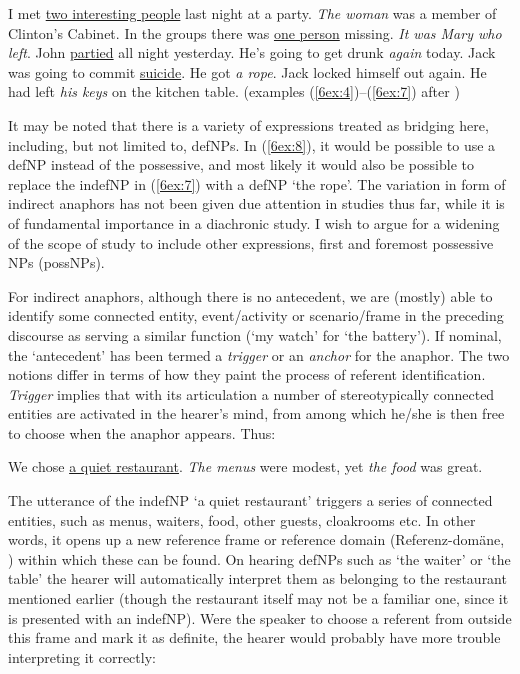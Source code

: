 \documentclass[output=paper]{langsci/langscibook}
\begin{document}
\begin{exe}
\ex\label{6ex:4}
I met {\ul{two interesting people}} last night at a party. {\emph{The woman}} was a member of Clinton's Cabinet. 
\ex\label{6ex:5}
In the groups there was {\ul{one person}} missing. {\emph{It was Mary who left}}. 
\ex\label{6ex:6}
John {\ul{partied}} all night yesterday. He's going to get drunk {\emph{again}} today.
\ex\label{6ex:7}
Jack was going to commit {\ul{suicide}}. He got {\emph{a rope}}. 
\ex\label{6ex:8}
Jack locked himself out again. He had left {\emph{his keys}} on the kitchen table. 
\exi{}
\hspace*{-0.8cm}(examples (\ref{6ex:4})--(\ref{6ex:7}) after \citealt[][83]{asher:lascarides:98})
\end{exe}

{
It may be noted that there is a variety of expressions treated as bridging here, including, but not limited to, defNPs. In (\ref{6ex:8}), it would be possible to use a defNP instead of the possessive, and most likely it would also be possible to replace the indefNP in (\ref{6ex:7}) with a defNP `the rope'. The variation in form of indirect anaphors has not been given due attention in studies thus far, while it is of fundamental importance in a diachronic study. I wish to argue for a widening of the scope of study to include other expressions, first and foremost possessive NPs (possNPs). 
}

{
For indirect anaphors, although there is no antecedent, we are (mostly) able to identify some connected entity, event/activity or scenario/frame in the preceding discourse as serving a similar function (`my watch' for `the battery'). If nominal, the `antecedent' has been termed a {\emph{trigger}} \citep{hawkins:78} or an {\emph{anchor}} \citep{fraurud:90} for the anaphor. The two notions differ in terms of how they paint the process of referent identification. {\emph{Trigger}} implies that with its articulation a number of stereotypically connected entities are activated in the hearer's mind, from among which he/she is then free to choose when the anaphor appears. Thus:
}

\begin{exe}
\ex\label{6ex:9}
{We chose {\ul{a quiet restaurant}}. {\emph{The menus}} were modest, yet {\emph{the food}} was great.}
\end{exe}

The utterance of the indefNP `a quiet restaurant' triggers a series of connected entities, such as menus, waiters, food, other guests, cloakrooms etc. In other words, it opens up a new reference frame or reference domain (Referenz-domäne, \citealt{schwarz:00}) within which these can be found. On hearing defNPs such as `the waiter' or `the table' the hearer will automatically interpret them as belonging to the restaurant mentioned earlier (though the restaurant itself may not be a familiar one, since it is presented with an indefNP). Were the speaker to choose a referent from outside this frame and mark it as definite, the hearer would probably have more trouble interpreting it correctly:
\end{document}
